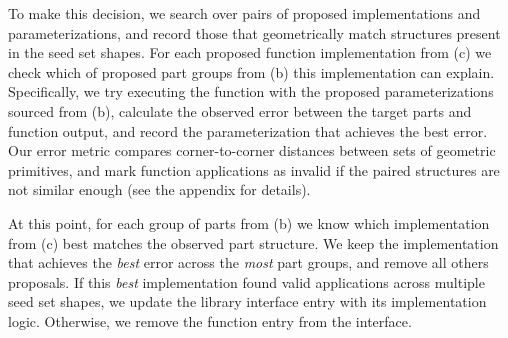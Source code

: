 To make this decision, we search over pairs of proposed implementations and parameterizations, and record those that geometrically match structures present in the seed set shapes.
For each  proposed function implementation from (c) we check which of proposed part groups from (b) this implementation can explain.
Specifically, we try executing the function with the proposed parameterizations sourced from (b), calculate the observed error between the target parts and function output, and record the parameterization that achieves the best error.
Our error metric compares corner-to-corner distances between sets of geometric primitives, and mark function applications as invalid  if the paired structures are not similar enough (see the appendix for details).

At this point, for each group of parts from (b) we know which implementation from (c) best matches the observed part structure.
We keep the implementation that achieves the \textit{best} error across the \textit{most} part groups, and remove all others proposals.
If this \textit{best} implementation found valid applications across multiple seed set shapes, we update the library interface entry with its implementation logic. 
Otherwise, we remove the function entry from the interface.

